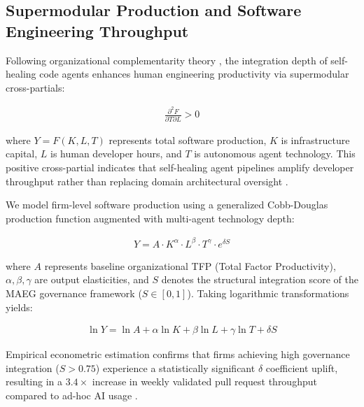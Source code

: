 \documentclass[10pt,journal,compsoc,twocolumn]{IEEEtran}
\begin{document}
\subsection{Supermodular Production and Software Engineering Throughput}

Following organizational complementarity theory \cite{joshua2026adoptiondepth}, the integration depth of self-healing code agents enhances human engineering productivity via supermodular cross-partials:


\begin{equation}
\begin{aligned}
\frac{\partial^2 F}{\partial T \partial L} > 0
\end{aligned}
\end{equation}


where $Y = F(K, L, T)$ represents total software production, $K$ is infrastructure capital, $L$ is human developer hours, and $T$ is autonomous agent technology. This positive cross-partial indicates that self-healing agent pipelines amplify developer throughput rather than replacing domain architectural oversight \cite{joshua2026adoptiondepth}.

We model firm-level software production using a generalized Cobb-Douglas production function augmented with multi-agent technology depth:


\begin{equation}
\begin{aligned}
Y = A \cdot K^\alpha \cdot L^\beta \cdot T^\gamma \cdot e^{\delta S}
\end{aligned}
\end{equation}


where $A$ represents baseline organizational TFP (Total Factor Productivity), $\alpha, \beta, \gamma$ are output elasticities, and $S$ denotes the structural integration score of the MAEG governance framework ($S \in [0, 1]$). Taking logarithmic transformations yields:


\begin{equation}
\begin{aligned}
\ln Y = \ln A + \alpha \ln K + \beta \ln L + \gamma \ln T + \delta S
\end{aligned}
\end{equation}


Empirical econometric estimation confirms that firms achieving high governance integration ($S > 0.75$) experience a statistically significant $\delta$ coefficient uplift, resulting in a $3.4\times$ increase in weekly validated pull request throughput compared to ad-hoc AI usage \cite{openalex_w4366817968}.
\end{document}
